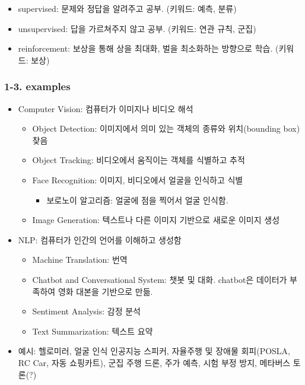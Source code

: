 \begin{itemize}
\tightlist
\item
  supervised: 문제와 정답을 알려주고 공부. (키워드: 예측, 분류)
\item
  unsupervised: 답을 가르쳐주지 않고 공부. (키워드: 연관 규칙, 군집)
\item
  reinforcement: 보상을 통해 상을 최대화, 벌을 최소화하는 방향으로 학습.
  (키워드: 보상)
\end{itemize}

\hypertarget{examples}{%
\subsubsection{1-3. examples}\label{examples}}

\begin{itemize}
\tightlist
\item
  Computer Vision: 컴퓨터가 이미지나 비디오 해석

  \begin{itemize}
  \tightlist
  \item
    Object Detection: 이미지에서 의미 있는 객체의 종류와 위치(bounding
    box) 찾음
  \item
    Object Tracking: 비디오에서 움직이는 객체를 식별하고 추적
  \item
    Face Recognition: 이미지, 비디오에서 얼굴을 인식하고 식별

    \begin{itemize}
    \tightlist
    \item
      보로노이 알고리즘: 얼굴에 점을 찍어서 얼굴 인식함.
    \end{itemize}
  \item
    Image Generation: 텍스트나 다른 이미지 기반으로 새로운 이미지 생성
  \end{itemize}
\item
  NLP: 컴퓨터가 인간의 언어를 이해하고 생성함

  \begin{itemize}
  \tightlist
  \item
    Machine Translation: 번역
  \item
    Chatbot and Conversational System: 챗봇 및 대화. chatbot은 데이터가
    부족하여 영화 대본을 기반으로 만듦.
  \item
    Sentiment Analysis: 감정 분석
  \item
    Text Summarization: 텍스트 요약
  \end{itemize}
\item
  예시: 헬로미러, 얼굴 인식 인공지능 스피커, 자율주행 및 장애물
  회피(POSLA, RC Car, 자동 쇼핑카트), 군집 주행 드론, 주가 예측, 시험
  부정 방지, 메타버스 토론(?)
\end{itemize}



